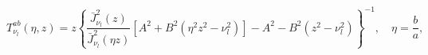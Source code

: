 \begin{equation}
T_{\nu _{l} }^{ab}(\eta ,z)=z\left\{ \frac{\bar{J}_{\nu _{l}
}^{2}(z)}{\bar{J}_{\nu _{l} }^{2}(\eta z)}\left[ A^{2}+B^{2}(\eta
^{2}z^{2}-\nu _{l} ^{2})\right] -A^{2}-B^{2}(z^{2}-\nu _{l}
^{2})\right\} ^{-1},\quad \eta =\frac{b}{a}, \label{tekaAB}
\end{equation}

